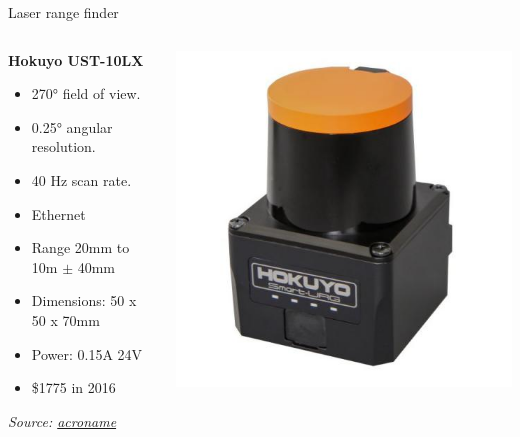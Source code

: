 \documentclass[compress]{beamer}
\newcommand{\source}[2]{{\tiny\it Source: \href{#1}{#2}}}
\begin{document}
\begin{frame}{Laser range finder}

    \begin{columns}
        \begin{column}{0.5\linewidth}
    \textbf{Hokuyo UST-10LX}

    \begin{itemize}

        \item 270° field of view.
        \item 0.25° angular resolution.
        \item 40 Hz scan rate.
        \item Ethernet
        \item Range 20mm to 10m $\pm$ 40mm
        \item Dimensions: 50 x 50 x 70mm
        \item Power: 0.15A 24V
        \item \$1775 in 2016
    \end{itemize}

            \source{https://acroname.com/products/HOKUYO-UST-10LX-LASER}{acroname}
            
        \end{column}
        \begin{column}{0.5\linewidth}
            \begin{center}
                \includegraphics[width=0.8\linewidth]{hokuyo}
            \end{center}
        \end{column}
    \end{columns}

\end{frame}
\end{document}
